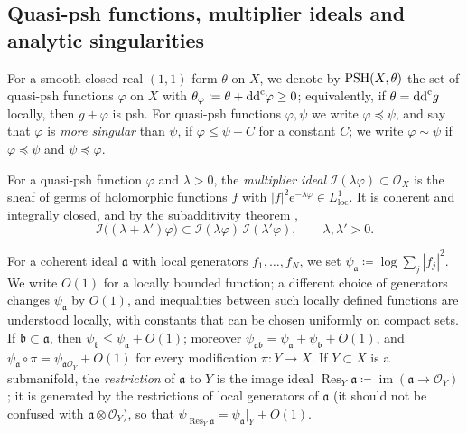 \documentclass[11pt,a4paper]{amsart}
\DeclareMathOperator{\im}{im}
\newcommand{\rest}[1]{\operatorname{Res}_{#1}}   %
\newcommand{\lessing}{\preceq}                   %
\theoremstyle{definition}
\begin{document}
\subsection{Quasi-psh functions, multiplier ideals and analytic
singularities}\label{sec:qpsh}

For a smooth closed real $(1,1)$-form $\theta$ on $X$, we denote by
$\mathrm{PSH}(X,\theta)$ the set of quasi-psh functions $\varphi$ on $X$ with
$\theta_\varphi\coloneqq \theta+\mathrm{dd}^{\mathrm{c}}\varphi\ge0$; equivalently, if
$\theta=\mathrm{dd}^{\mathrm{c}} g$ locally, then $g+\varphi$ is psh. For quasi-psh functions
$\varphi,\psi$ we write $\varphi\lessing\psi$, and say that $\varphi$ is
\emph{more singular} than $\psi$, if $\varphi\le\psi+C$ for a constant
$C$; we write $\varphi\sim\psi$ if $\varphi\lessing\psi$ and
$\psi\lessing\varphi$.

For a quasi-psh function $\varphi$ and $\lambda>0$, the
\emph{multiplier ideal} $\mathcal I(\lambda\varphi)\subset\mathcal O_X$
\cite{Nad90} is the sheaf of germs of holomorphic functions $f$ with
$|f|^2\mathrm{e}^{-\lambda\varphi}\in L^1_{\mathrm{loc}}$. It is coherent
and integrally closed, and by the subadditivity theorem \cite{DEL00},
\begin{equation}\label{eq:subadditivity}
  \mathcal I\bigl((\lambda+\lambda')\varphi\bigr)
  \subset\mathcal I(\lambda\varphi)\,\mathcal I(\lambda'\varphi),
  \qquad \lambda,\lambda'>0.
\end{equation}

For a coherent ideal $\mathfrak a$ with local generators
$f_1,\dots,f_N$, we set $\psi_{\mathfrak a}\coloneqq \log\sum_j|f_j|^2$.
We write $O(1)$ for a locally bounded function; a different choice of
generators changes $\psi_{\mathfrak a}$ by $O(1)$, and inequalities
between such locally defined functions are understood locally, with
constants that can be chosen uniformly on compact sets. If
$\mathfrak b\subset\mathfrak a$, then
$\psi_{\mathfrak b}\le\psi_{\mathfrak a}+O(1)$; moreover
$\psi_{\mathfrak a\mathfrak b}=\psi_{\mathfrak a}+\psi_{\mathfrak b}+O(1)$,
and $\psi_{\mathfrak a}\circ\pi=\psi_{\mathfrak a\mathcal O_Y}+O(1)$ for
every modification $\pi\colon Y\to X$. If $Y\subset X$ is a submanifold,
the \emph{restriction} of $\mathfrak a$ to $Y$ is the image ideal
$\rest{Y}\mathfrak a\coloneqq \im(\mathfrak a\to\mathcal O_Y)$
\cite[Definition~1.4.5]{XiaSGPT}; it is generated by the restrictions of
local generators of $\mathfrak a$ (it should not be confused with
$\mathfrak a\otimes\mathcal O_Y$), so that
$\psi_{\rest Y\mathfrak a}=\psi_{\mathfrak a}|_Y+O(1)$.
\end{document}
